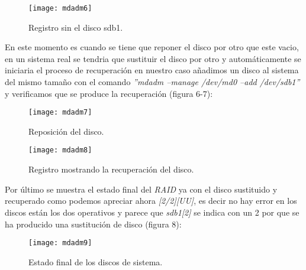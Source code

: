 \documentclass[a4paper, 10pt]{article} %
\begin{document}
\begin{figure}[H]
\centering 
\texttt{[image: mdadm6]} 
\caption{Registro sin el disco sdb1.} 
\label{contexto:figura} 
\end{figure}
En este momento es cuando se tiene que reponer el disco por otro que este vacio, en un sistema real se tendria que sustituir el disco por otro y automáticamente se iniciaria el proceso de recuperación en nuestro caso añadimos un disco al sistema del mismo tamaño con el comando \textit{''mdadm --manage /dev/md0 --add /dev/sdb1''} y verificamos que se produce la recuperación (figura 6-7):
\begin{figure}[H]
\centering 
\texttt{[image: mdadm7]} 
\caption{Reposición del disco.} 
\label{contexto:figura} 
\end{figure}
\begin{figure}[H]
\centering 
\texttt{[image: mdadm8]} 
\caption{Registro mostrando la recuperación del disco.} 
\label{contexto:figura} 
\end{figure}
Por último se muestra el estado final del \textit{RAID} ya con el disco sustituido y recuperado como podemos apreciar ahora \textit{[2/2][UU]}, es decir no hay error en los discos están los dos operativos y parece que \textit{sdb1[2]} se indica con un 2 por que se ha producido una sustitución de disco (figura 8):
\begin{figure}[H]
\centering 
\texttt{[image: mdadm9]} 
\caption{Estado final de los discos de sistema.} 
\label{contexto:figura} 
\end{figure}
\end{document}
